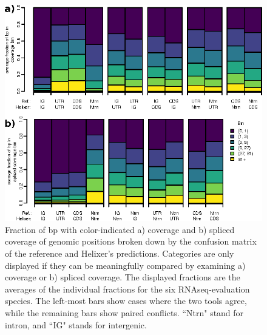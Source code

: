 \documentclass{article}
\renewcommand{\thefigure}{S\arabic{figure}}
\begin{document}
\begin{figure}[!h]
\label{supfig:average_vs_ref}
\centerline{\includegraphics[]{images/cov_examples/average_vs_ref}}
\caption{
Fraction of bp with color-indicated a) coverage and b) spliced coverage of genomic positions
broken down by the confusion matrix of the reference and Helixer's predictions. Categories
are only displayed if they can be meaningfully compared by examining a) coverage or b) spliced
coverage. The displayed fractions are the averages of the individual fractions for the
six RNAseq-evaluation species. The left-most bars show cases where the two tools agree,
while the remaining bars show paired conflicts. ``Ntrn" stand
for intron, and ``IG" stands for intergenic.
}
\end{figure}
\end{document}

